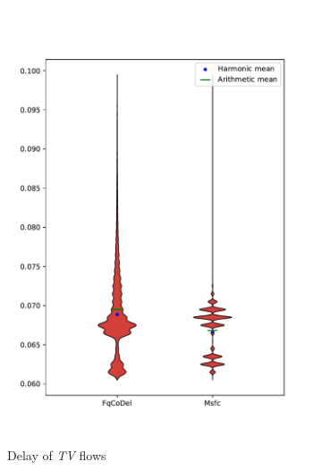 \begin{figure}
\begin{subfigure}[b]{0.475\textwidth}
		\includegraphics[width=\textwidth]{drawings/type3-delay-down_A}
		\caption[]%
		{{\small Delay of \emph{TV} flows}}    
		\label{fig:delay_tv}
	\end{subfigure}
	\par\bigskip %
	\begin{subfigure}[b]{0.475\textwidth}   
		\centering 

\end{subfigure}
\end{figure}

